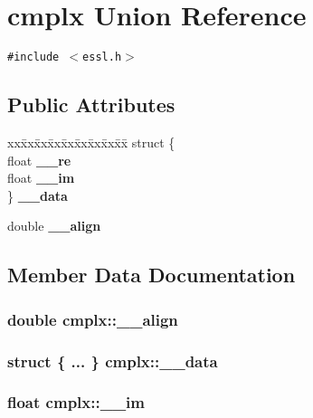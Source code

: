 \section{cmplx Union Reference}
\label{unioncmplx}
{\tt \#include $<$essl.h$>$}

\subsection*{Public Attributes}
\begin{CompactItemize}
\item 
\begin{tabbing}
xx\=xx\=xx\=xx\=xx\=xx\=xx\=xx\=xx\=\kill
struct \{\\
\>float {\bf \_\_re}\\
\>float {\bf \_\_im}\\
\} {\bf \_\_data}\\

\end{tabbing}\item 
double {\bf \_\-\_\-align}
\end{CompactItemize}


\subsection{Member Data Documentation}
\subsubsection{\setlength{\rightskip}{0pt plus 5cm}double {\bf cmplx::\_\-\_\-align}}\label{unioncmplx_f1941f044459d64d098b2c9f540d6781}


\subsubsection{\setlength{\rightskip}{0pt plus 5cm}struct \{ ... \}   {\bf cmplx::\_\-\_\-data}}\label{unioncmplx_cdf1ae172ba809491971768f535de196}


\subsubsection{\setlength{\rightskip}{0pt plus 5cm}float {\bf cmplx::\_\-\_\-im}}\label{unioncmplx_bcb560fd44e875ff3667997f4018121a}


